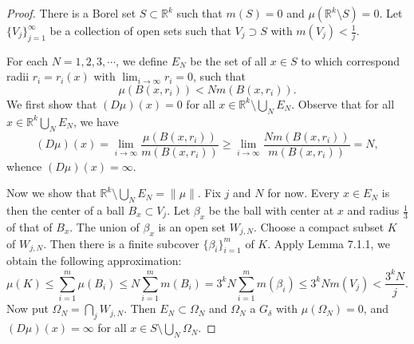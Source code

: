 \begin{proof}
There is a Borel set $S\subset\mathbb{R}^k$ such that $m(S)=0$ and $\mu(\mathbb{R}^k\setminus S)=0$. Let $\{V_j\}_{j=1}^\infty$ be a collection of open sets such that $V_j\supset S$ with $m(V_j)<\frac{1}{j}$.\par
For each $N=1,2,3,\cdots$, we define $E_N$ be the set of all $x\in S$ to which correspond radii $r_i=r_i(x)$ with $\lim_{i\to\infty}r_i=0$, such that 
$$
\mu \left( B\left( x,r_i \right) \right) <Nm\left( B\left( x,r_i \right) \right) .
$$
We first show that $(D\mu)(x)=0$ for all $x\in\mathbb{R}^k\setminus\bigcup_{N}E_N$. Observe that for all $x\in\mathbb{R}^k\bigcup_NE_N$, we have 
$$
\left( D\mu \right) \left( x \right) =\lim_{i\rightarrow \infty} \frac{\mu \left( B\left( x,r_i \right) \right)}{m\left( B\left( x,r_i \right) \right)}\ge \lim_{i\rightarrow \infty} \frac{Nm\left( B\left( x,r_i \right) \right)}{m\left( B\left( x,r_i \right) \right)}=N,
$$
whence $(D\mu)(x)=\infty$.\par
Now we show that $\mathbb{R}^k\setminus\bigcup_NE_N=\|\mu\|$. Fix $j$ and $N$ for now. Every $x\in E_N$ is then the center of a ball $B_x\subset V_j$. Let $\beta_x$ be the ball with center at $x$ and radius $\frac{1}{3}$ of that of $B_x$. The union of $\beta_x$ is an open set $W_{j,N}$. Choose a compact subset $K$ of $W_{j,N}$. Then there is a finite subcover $\{\beta_i\}_{i=1}^m$ of $K$. Apply Lemma 7.1.1, we obtain the following approximation: 
$$
\mu \left( K \right) \le \sum_{i=1}^m{\mu \left( B_i \right)}\le N\sum_{i=1}^m{m\left( B_i \right)}=3^kN\sum_{i=1}^m{m\left( \beta _i \right)}\le 3^kNm\left( V_j \right) <\frac{3^kN}{j}.
$$
Now put $\Omega_N=\bigcap_jW_{j,N}$. Then $E_N\subset\Omega_N$ and $\Omega_N$ a $G_\delta$ with $\mu(\Omega_N)=0$, and $(D\mu)(x)=\infty$ for all $x\in S\setminus\bigcup_N\Omega_N$.
\end{proof}
